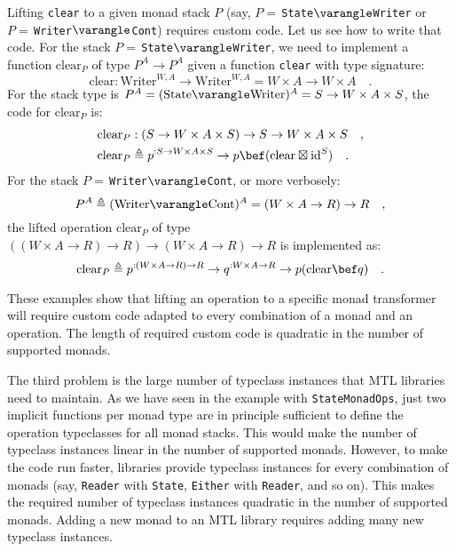 Lifting \lstinline!clear! to a given monad stack $P$ (say, $P=\,$\lstinline!State!$\varangle$\lstinline!Writer!
or $P=\,$\lstinline!Writer!$\varangle$\lstinline!Cont!) requires
custom code. Let us see how to write that code. For the stack $P=\,$\lstinline!State!$\varangle$\lstinline!Writer!,
we need to implement a function $\text{clear}_{P}$ of type $P^{A}\rightarrow P^{A}$
given a function \lstinline!clear! with type signature:
\[
\text{clear}:\text{Writer}^{W,A}\rightarrow\text{Writer}^{W,A}=W\times A\rightarrow W\times A\quad.
\]
For the stack type is $P^{A}=(\text{State}\varangle\text{Writer})^{A}=S\rightarrow W\times A\times S$,
the code for $\text{clear}_{P}$ is:
\begin{align*}
 & \text{clear}_{P}:\left(S\rightarrow W\times A\times S\right)\rightarrow S\rightarrow W\times A\times S\quad,\\
 & \text{clear}_{P}\triangleq p^{:S\rightarrow W\times A\times S}\rightarrow p\bef(\text{clear}\boxtimes\text{id}^{S})\quad.
\end{align*}
For the stack $P=\,$\lstinline!Writer!$\varangle$\lstinline!Cont!,
or more verbosely:
\[
P^{A}\triangleq(\text{Writer}\varangle\text{Cont})^{A}=(W\times A\rightarrow R)\rightarrow R\quad,
\]
the lifted operation $\text{clear}_{P}$ of type $\left((W\times A\rightarrow R)\rightarrow R\right)\rightarrow(W\times A\rightarrow R)\rightarrow R$
is implemented as:
\[
\text{clear}_{P}\triangleq p^{:(W\times A\rightarrow R)\rightarrow R}\rightarrow q^{:W\times A\rightarrow R}\rightarrow p(\text{clear}\bef q)\quad.
\]

These examples show that lifting an operation to a specific monad
transformer will require custom code adapted to every combination
of a monad and an operation. The length of required custom code is
quadratic in the number of supported monads.

The third problem is the large number of typeclass instances that
MTL libraries need to maintain. As we have seen in the example with
\lstinline!StateMonadOps!, just two implicit functions per monad
type are in principle sufficient to define the operation typeclasses
for all monad stacks. This would make the number of typeclass instances
linear in the number of supported monads. However, to make the code
run faster, libraries provide typeclass instances for every combination
of monads (say, \lstinline!Reader! with \lstinline!State!, \lstinline!Either!
with \lstinline!Reader!, and so on). This makes the required number
of typeclass instances quadratic in the number of supported monads.
Adding a new monad to an MTL library requires adding many new typeclass
instances.

